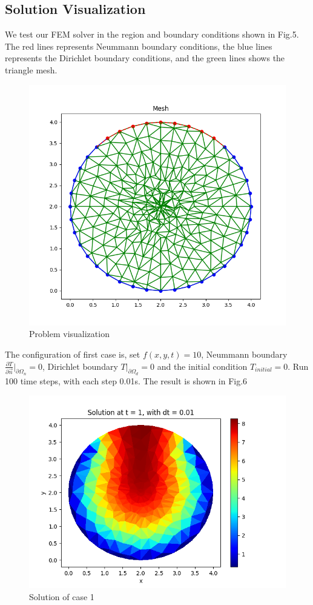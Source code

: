 \documentclass[conference]{IEEEtran}
\begin{document}
    \subsection{Solution Visualization}
    We test our FEM solver in the region and boundary conditions shown in Fig.5. The red lines represents 
    Neummann boundary conditions, the blue lines represents the Dirichlet boundary conditions, and the green lines
    shows the triangle mesh.
    \begin{figure}[H]
        \centering
        \includegraphics[scale=0.35]{../fig/mesh.png}
        \caption{Problem visualization}
    \end{figure}
    The configuration of first case is, set $f(x, y, t) = 10$, Neummann boundary $\frac{\partial{T}}{\partial{\vec{n}}}\big |_{\partial{\Omega_n}} = 0$, 
    Dirichlet boundary $T\big| _{\partial{\Omega_d}} = 0$ and the initial condition $T_{initial} = 0$. Run 100 time steps, 
    with each step 0.01s. The result is shown in Fig.6
    \begin{figure}[H]
        \centering
        \includegraphics[scale=0.4]{../fig/ext_heat10_zero_others.png}
        \caption{Solution of case 1}
    \end{figure}
\end{document}
